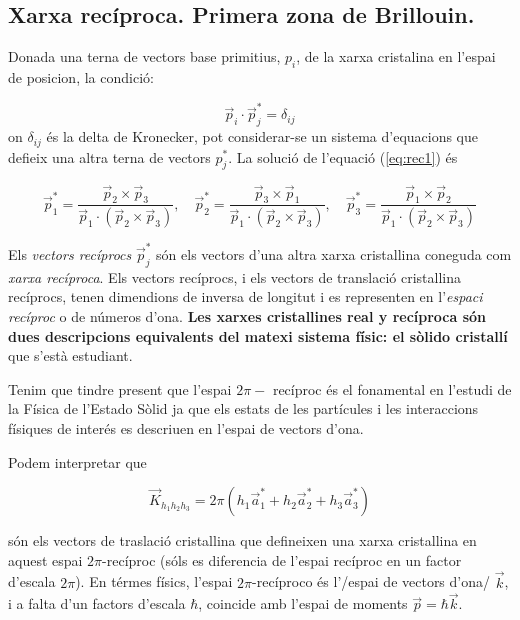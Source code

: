 \documentclass[12pt,twoside,a4paper, notitlepage]{article}%
\begin{document}
\subsection{Xarxa recíproca. Primera zona de Brillouin.}
Donada una terna de vectors base primitius, $p_i$, de la xarxa cristalina en l'espai de posicion, la condició:

\begin{equation}
\label{eq:rec1}
\vec p_i\cdot\vec p_j^{*}=\delta_{ij}
\end{equation}
on $\delta_{ij}$ és la delta de Kronecker, pot considerar-se un sistema d'equacions que defieix una altra terna de vectors $p_j^*$. La solució de l'equació (\ref{eq:rec1}) és

\begin{equation}
\label{eq:rec2}
\vec p_1^*=\frac{\vec p_2\times\vec p_3}{\vec p_1\cdot(\vec p_2\times\vec p_3)},\quad \vec p_2^*=\frac{\vec p_3\times\vec p_1}{\vec p_1\cdot(\vec p_2\times\vec p_3)}, \quad \vec p_3^*=\frac{\vec p_1\times\vec p_2}{\vec p_1\cdot(\vec p_2\times\vec p_3)}
\end{equation} 

Els \textit{vectors recíprocs} $\vec p_j^{*}$ són els vectors d'una altra xarxa cristallina coneguda com \textit{xarxa recíproca}. Els  vectors recíprocs, i els vectors de translació cristallina recíprocs, tenen dimendions de inversa de longitut i es representen en l'\textit{espaci recíproc} o de números d'ona. \textbf{Les xarxes cristallines real y recíproca són dues descripcions equivalents del matexi sistema físic: el sòlido cristallí} que s'està estudiant.


Tenim que tindre present que l'espai $2\pi-$ recíproc és el fonamental en l'estudi de la Física de l'Estado Sòlid ja que els estats de les partícules i les interaccions físiques de interés es descriuen en l'espai de vectors d'ona.

Podem interpretar que 

\begin{equation}
\label{eq:rec3}
\vec K_{h_1h_2h_3}=2\pi\left(h_1\vec a_1^{*}+h_2\vec a_2^{*}+h_3\vec a_3^{*}\right)
\end{equation}

són els vectors de traslació cristallina que defineixen una xarxa cristallina en aquest espai $2\pi$-recíproc (sóls es diferencia de l'espai recíproc en un factor d'escala $2\pi$). En térmes físics, l'espai $2\pi$-recíproco és l'/espai de vectors d'ona/ $\vec k$, i a falta d'un factors d'escala $\hbar$, coincide amb l'espai de moments  $\vec p=\hbar\vec k$. 
\end{document}
